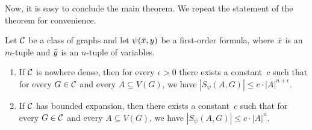 Now, it is easy to conclude the main theorem. We repeat the statement of the theorem 
for convenience.

\setcounter{theorem}{2}
\begin{theorem}
Let $\mathcal{C}$ be a class of graphs and let $\psi(\bar{x},y)$ be a first-order formula, where 
$\bar{x}$ is an $m$-tuple and $\bar{y}$ is an $n$-tuple of variables. 
\begin{enumerate}
\item If $\mathcal{C}$ is nowhere dense, then for every $\epsilon>0$ 
there exists a constant~$c$ such that for every $G\in \mathcal{C}$ and every
$A\subseteq V(G)$, we have $|S_\psi(A,G)|\leq c\cdot |A|^{n+\epsilon}.$

\item If $\mathcal{C}$ has bounded expansion, then there exists a constant~$c$ such that for every $G\in \mathcal{C}$ and every $A\subseteq V(G)$, we have $|S_\psi(A,G)|\leq c\cdot |A|^n$.
\end{enumerate}
\end{theorem}

